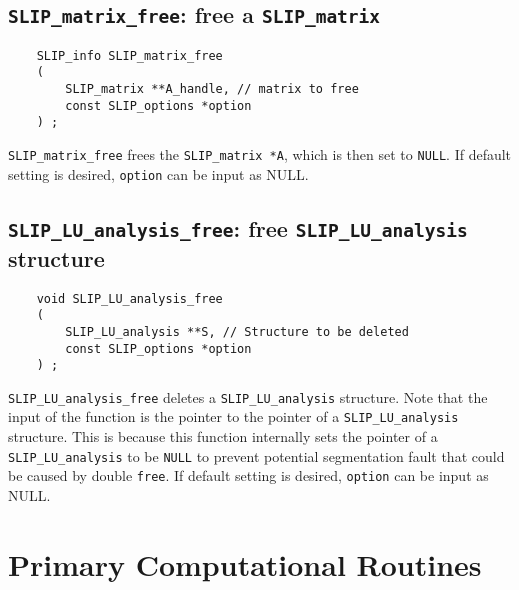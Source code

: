 \documentclass[12pt]{article}
\theoremstyle{definition}
\begin{document}
\cprotect\subsection{\verb|SLIP_matrix_free|: free a \verb'SLIP_matrix'}
\label{s:user:matrix_free}

\begin{mdframed}[userdefinedwidth=6in]
{\footnotesize
\begin{verbatim}
    SLIP_info SLIP_matrix_free
    (
        SLIP_matrix **A_handle, // matrix to free
        const SLIP_options *option
    ) ;
\end{verbatim}
} \end{mdframed}

\verb|SLIP_matrix_free| frees the \verb|SLIP_matrix *A|,
which is then set to \verb|NULL|.
If default setting is desired, \verb|option| can be input as NULL.

\cprotect\subsection{\verb|SLIP_LU_analysis_free|: free \verb|SLIP_LU_analysis| structure}
\label{ss:LU_analysis_free}

\begin{mdframed}[userdefinedwidth=6in]
{\footnotesize
\begin{verbatim}
    void SLIP_LU_analysis_free
    (
        SLIP_LU_analysis **S, // Structure to be deleted
        const SLIP_options *option
    ) ;
\end{verbatim}
} \end{mdframed}


\verb|SLIP_LU_analysis_free| deletes a \verb|SLIP_LU_analysis| structure.
Note that the input of the function is the pointer to the pointer of a
\verb|SLIP_LU_analysis| structure. This is because this function internally
sets the pointer of a \verb|SLIP_LU_analysis| to be \verb|NULL| to prevent
potential segmentation fault that could be caused by double \verb|free|.
If default setting is desired, \verb|option| can be input as NULL.


\section{Primary Computational Routines}
\label{s:primary}
\end{document}
